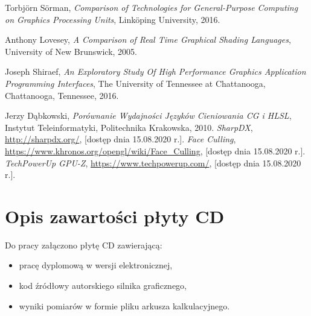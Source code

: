 \documentclass[archive]{mgr}
\begin{document}
\begin{thebibliography}{9}
Torbjörn Sörman, \emph{Comparison of Technologies for General-Purpose Computing on Graphics Processing Units}, Linköping University, 2016.

Anthony Lovesey, \emph{A Comparison of Real Time Graphical Shading Languages}, University of New Brunswick, 2005.

Joseph Shiraef, \emph{An Exploratory Study Of High Performance Graphics Application Programming Interfaces}, The University of Tennessee at Chattanooga, Chattanooga, Tennessee, 2016.

Jerzy Dąbkowski, \emph{Porównanie Wydajności Języków Cieniowania CG i HLSL}, Instytut Teleinformatyki, Politechnika Krakowska, 2010.
\emph{SharpDX}, \url{http://sharpdx.org/}, [dostęp dnia 15.08.2020 r.].
\emph{Face Culling}, \url{https://www.khronos.org/opengl/wiki/Face_Culling}, [dostęp dnia 15.08.2020 r.].\\
\emph{TechPowerUp GPU-Z}, \url{https://www.techpowerup.com/}, [dostęp dnia 15.08.2020 r.].\\


\end{thebibliography}
\appendix
\chapter{Opis zawartości płyty CD}
Do pracy załączono płytę CD zawierającą:
\begin{itemize}
\item pracę dyplomową w wersji elektronicznej,
\item kod źródłowy autorskiego silnika graficznego,
\item wyniki pomiarów w formie pliku arkusza kalkulacyjnego.
\end{itemize}
\end{document}
